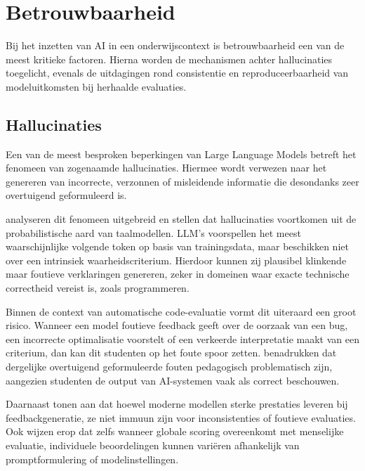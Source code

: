 
\section{Betrouwbaarheid}
\label{ch:betrouwbaarheid-detectie-output}

Bij het inzetten van AI in een onderwijscontext is betrouwbaarheid een van de meest kritieke factoren. Hierna worden de mechanismen achter hallucinaties toegelicht, evenals de uitdagingen rond consistentie en reproduceerbaarheid van modeluitkomsten bij herhaalde evaluaties.

\subsection{Hallucinaties}

Een van de meest besproken beperkingen van Large Language Models betreft het fenomeen van zogenaamde hallucinaties. Hiermee wordt verwezen naar het genereren van incorrecte, verzonnen of misleidende informatie die desondanks zeer overtuigend geformuleerd is.

\vspace{1em}

\textcite{Ye2023} analyseren dit fenomeen uitgebreid en stellen dat hallucinaties voortkomen uit de probabilistische aard van taalmodellen. LLM’s voorspellen het meest waarschijnlijke volgende token op basis van trainingsdata, maar beschikken niet over een intrinsiek waarheidscriterium. Hierdoor kunnen zij plausibel klinkende maar foutieve verklaringen genereren, zeker in domeinen waar exacte technische correctheid vereist is, zoals programmeren.

\vspace{1em}

Binnen de context van automatische code-evaluatie vormt dit uiteraard een groot risico. Wanneer een model foutieve feedback geeft over de oorzaak van een bug, een incorrecte optimalisatie voorstelt of een verkeerde interpretatie maakt van een criterium, dan kan dit studenten op het foute spoor zetten. \textcite{Kasneci2023} benadrukken dat dergelijke overtuigend geformuleerde fouten pedagogisch problematisch zijn, aangezien studenten de output van AI-systemen vaak als correct beschouwen.

\vspace{1em}

Daarnaast tonen \textcite{Koutcheme2025} aan dat hoewel moderne modellen sterke prestaties leveren bij feedbackgeneratie, ze niet immuun zijn voor inconsistenties of foutieve evaluaties. Ook \textcite{Mendonca2025} wijzen erop dat zelfs wanneer globale scoring overeenkomt met menselijke evaluatie, individuele beoordelingen kunnen variëren afhankelijk van promptformulering of modelinstellingen.

